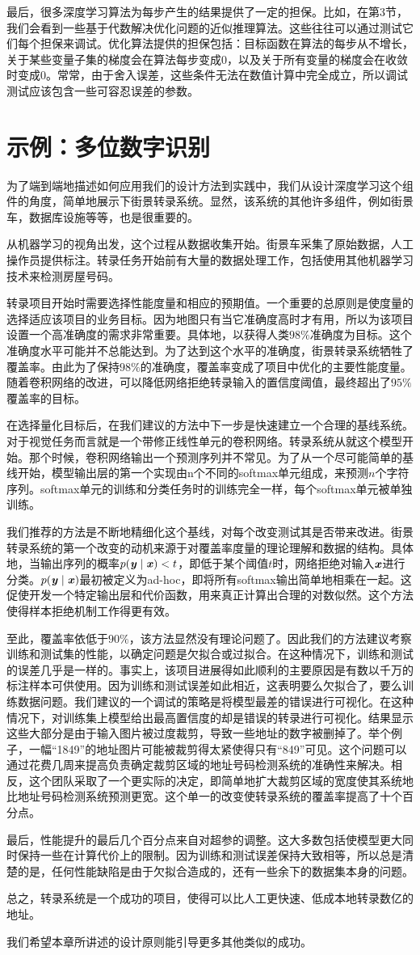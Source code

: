 最后，很多深度学习算法为每步产生的结果提供了一定的担保。比如，在第3节，我们会看到一些基于代数解决优化问题的近似推理算法。这些往往可以通过测试它们每个担保来调试。优化算法提供的担保包括：目标函数在算法的每步从不增长，关于某些变量子集的梯度会在算法每步变成0，以及关于所有变量的梯度会在收敛时变成0。常常，由于舍入误差，这些条件无法在数值计算中完全成立，所以调试测试应该包含一些可容忍误差的参数。

\section{示例：多位数字识别}
为了端到端地描述如何应用我们的设计方法到实践中，我们从设计深度学习这个组件的角度，简单地展示下街景转录系统。显然，该系统的其他许多组件，例如街景车，数据库设施等等，也是很重要的。

从机器学习的视角出发，这个过程从数据收集开始。街景车采集了原始数据，人工操作员提供标注。转录任务开始前有大量的数据处理工作，包括使用其他机器学习技术来检测房屋号码。

转录项目开始时需要选择性能度量和相应的预期值。一个重要的总原则是使度量的选择适应该项目的业务目标。因为地图只有当它准确度高时才有用，所以为该项目设置一个高准确度的需求非常重要。具体地，以获得人类$98\%$准确度为目标。这个准确度水平可能并不总能达到。为了达到这个水平的准确度，街景转录系统牺牲了覆盖率。由此为了保持$98\%$的准确度，覆盖率变成了项目中优化的主要性能度量。随着卷积网络的改进，可以降低网络拒绝转录输入的置信度阈值，最终超出了$95\%$覆盖率的目标。

在选择量化目标后，在我们建议的方法中下一步是快速建立一个合理的基线系统。对于视觉任务而言就是一个带修正线性单元的卷积网络。转录系统从就这个模型开始。那个时候，卷积网络输出一个预测序列并不常见。为了从一个尽可能简单的基线开始，模型输出层的第一个实现由n个不同的softmax单元组成，来预测$n$个字符序列。softmax单元的训练和分类任务时的训练完全一样，每个softmax单元被单独训练。

我们推荐的方法是不断地精细化这个基线，对每个改变测试其是否带来改进。街景转录系统的第一个改变的动机来源于对覆盖率度量的理论理解和数据的结构。具体地，当输出序列的概率$p(\boldsymbol{\mathit{y}}\mid\boldsymbol{\mathit{x}}) < t$，即低于某个阈值$t$时，网络拒绝对输入$\boldsymbol{\mathit{x}}$进行分类。$p(\boldsymbol{\mathit{y}}\mid\boldsymbol{\mathit{x}})$最初被定义为ad-hoc，即将所有softmax输出简单地相乘在一起。这促使开发一个特定输出层和代价函数，用来真正计算出合理的对数似然。这个方法使得样本拒绝机制工作得更有效。

至此，覆盖率依低于$90\%$，该方法显然没有理论问题了。因此我们的方法建议考察训练和测试集的性能，以确定问题是欠拟合或过拟合。在这种情况下，训练和测试的误差几乎是一样的。事实上，该项目进展得如此顺利的主要原因是有数以千万的标注样本可供使用。因为训练和测试误差如此相近，这表明要么欠拟合了，要么训练数据问题。我们建议的一个调试的策略是将模型最差的错误进行可视化。在这种情况下，对训练集上模型给出最高置信度的却是错误的转录进行可视化。结果显示这些大部分是由于输入图片被过度裁剪，导致一些地址的数字被删掉了。举个例子，一幅``1849''的地址图片可能被裁剪得太紧使得只有``849''可见。这个问题可以通过花费几周来提高负责确定裁剪区域的地址号码检测系统的准确性来解决。相反，这个团队采取了一个更实际的决定，即简单地扩大裁剪区域的宽度使其系统地比地址号码检测系统预测更宽。这个单一的改变使转录系统的覆盖率提高了十个百分点。

最后，性能提升的最后几个百分点来自对超参的调整。这大多数包括使模型更大同时保持一些在计算代价上的限制。因为训练和测试误差保持大致相等，所以总是清楚的是，任何性能缺陷是由于欠拟合造成的，还有一些余下的数据集本身的问题。

总之，转录系统是一个成功的项目，使得可以比人工更快速、低成本地转录数亿的地址。

我们希望本章所讲述的设计原则能引导更多其他类似的成功。
